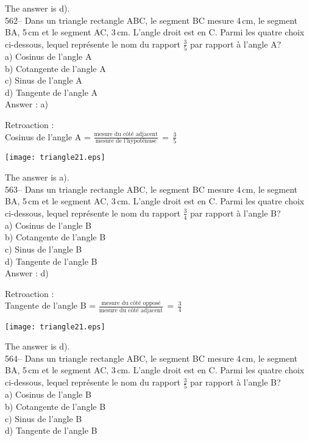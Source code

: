 ﻿\documentclass[letterpaper, 12pt]{article}
\begin{document}
The answer is d).\\


562-- Dans un triangle rectangle ABC, le segment BC mesure 4\,cm, le segment
BA, 5\,cm et le segment AC, 3\,cm.  L'angle droit est en C.  Parmi les
quatre choix ci-dessous, lequel repr\'esente le nom du rapport $\frac{3}{5}$
par rapport \`a l'angle A?\\
a) Cosinus de l'angle A\\
b) Cotangente de l'angle A\\
c) Sinus de l'angle A\\
d) Tangente de l'angle A\\

Answer : a)

Retroaction : \\
Cosinus de l'angle A = $\frac{\textrm{mesure du c\^ot\'e
adjacent}}{\textrm{mesure de
l'hypot\'enuse}}\,=\,\frac{\textrm{3}}{\textrm{5}}$\\
\begin{center}
    \texttt{[image: triangle21.eps]}
    \end{center}
The answer is a).\\

563-- Dans un triangle rectangle ABC, le segment BC mesure 4\,cm, le segment
BA, 5\,cm et le segment AC, 3\,cm.  L'angle droit est en C.  Parmi les
quatre choix ci-dessous, lequel repr\'esente le nom du rapport $\frac{3}{4}$
par rapport \`a l'angle B?\\
a) Cosinus de l'angle B\\
b) Cotangente de l'angle B\\
c) Sinus de l'angle B\\
d) Tangente de l'angle B\\

Answer : d)

Retroaction : \\
Tangente de l'angle B = $\frac{\textrm{mesure du c\^ot\'e
oppos\'e}}{\textrm{mesure du c\^ot\'e
adjacent}}\,=\,\frac{\textrm{3}}{\textrm{4}}$\\
\begin{center}
    \texttt{[image: triangle21.eps]}
    \end{center}
The answer is d).\\

564-- Dans un triangle rectangle ABC, le segment BC mesure 4\,cm, le segment
BA, 5\,cm et le segment AC, 3\,cm.  L'angle droit est en C.  Parmi les
quatre choix ci-dessous, lequel repr\'esente le nom du rapport $\frac{3}{5}$
par rapport \`a l'angle B?\\
a) Cosinus de l'angle B\\
b) Cotangente de l'angle B\\
c) Sinus de l'angle B\\
d) Tangente de l'angle B\\
\end{document}
